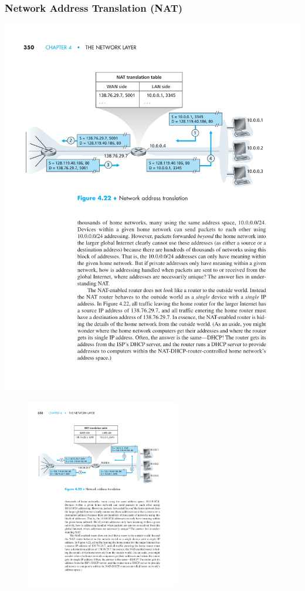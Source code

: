 \documentclass[xcolor=dvipsnames,10pt,compress,aspectratio=169]{beamer}
\begin{document}
\begin{frame}
  \frametitle{Network Address Translation (NAT)}
{
  \includegraphics[width=\textwidth]{kurose-04-22}
}
{
  \begin{figure}[ht]
  \centering
  \includegraphics[width=0.6\textwidth]{kurose-04-22}
  \end{figure}
}
\end{frame}
\end{document}
